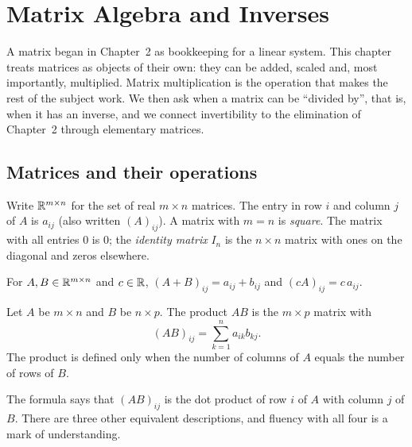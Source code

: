 \chapter{Matrix Algebra and Inverses}

A matrix began in Chapter~2 as bookkeeping for a linear system. This chapter treats matrices as objects of their own: they can be added, scaled and, most importantly, multiplied. Matrix multiplication is the operation that makes the rest of the subject work. We then ask when a matrix can be ``divided by'', that is, when it has an inverse, and we connect invertibility to the elimination of Chapter~2 through elementary matrices.

\section{Matrices and their operations}

Write $\mathbb{R}^{m\times n}$ for the set of real $m\times n$ matrices. The entry in row $i$ and column $j$ of $A$ is $a_{ij}$ (also written $(A)_{ij}$). A matrix with $m=n$ is \emph{square}. The matrix with all entries $0$ is $0$; the \emph{identity matrix} $I_n$ is the $n\times n$ matrix with ones on the diagonal and zeros elsewhere.

\begin{definition}
For $A,B\in\mathbb{R}^{m\times n}$ and $c\in\mathbb{R}$, $(A+B)_{ij}=a_{ij}+b_{ij}$ and $(cA)_{ij}=c\,a_{ij}$.
\end{definition}

\begin{definition}
Let $A$ be $m\times n$ and $B$ be $n\times p$. The product $AB$ is the $m\times p$ matrix with
\[ (AB)_{ij}=\sum_{k=1}^n a_{ik}b_{kj}. \]
The product is defined only when the number of columns of $A$ equals the number of rows of $B$.
\end{definition}

The formula says that $(AB)_{ij}$ is the dot product of row $i$ of $A$ with column $j$ of $B$. There are three other equivalent descriptions, and fluency with all four is a mark of understanding.

